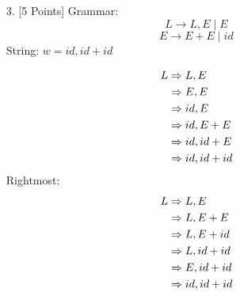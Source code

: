 \documentclass[12pt]{article}
\begin{document}
\begin{enumerate}[label=\arabic*.]
    
    \item[3.] [5 Points] Grammar:
    \[
        L \rightarrow L,E \mid E
    \]
    \[
        E \rightarrow E+E \mid id
    \]
    String: $w = id, id + id$
    
    
\begin{align}
L &\Rightarrow L, E \notag\\
  &\Rightarrow E, E \notag\\
  &\Rightarrow id, E \notag\\
  &\Rightarrow id, E + E \notag\\
  &\Rightarrow id, id + E \notag\\
  &\Rightarrow id, id + id
\end{align}
Rightmost:
\begin{align}
L &\Rightarrow L, E \notag\\
  &\Rightarrow L, E + E \notag\\
  &\Rightarrow L, E + id \notag\\
  &\Rightarrow L, id + id \notag\\
  &\Rightarrow E, id + id \notag\\
  &\Rightarrow id, id + id
\end{align}

    
    
\end{enumerate}
\end{document}
